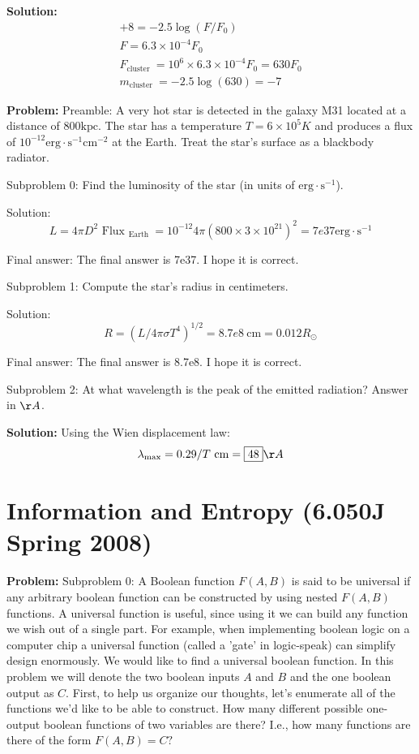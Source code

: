 \documentclass[10pt]{article}
\begin{document}
\textbf{Solution:}
\[
\begin{gathered}
+8=-2.5 \log \left(F / F_{0}\right) \\
F=6.3 \times 10^{-4} F_{0} \\
F_{\text {cluster }}=10^{6} \times 6.3 \times 10^{-4} F_{0}=630 F_{0} \\
m_{\text {cluster }}=-2.5 \log (630)=\boxed{-7}
\end{gathered}
\]


\textbf{Problem:}
Preamble: A very hot star is detected in the galaxy M31 located at a distance of $800 \mathrm{kpc}$. The star has a temperature $T = 6 \times 10^{5} K$ and produces a flux of $10^{-12} \mathrm{erg} \cdot \mathrm{s}^{-1} \mathrm{cm}^{-2}$ at the Earth. Treat the star's surface as a blackbody radiator.

Subproblem 0: Find the luminosity of the star (in units of $\mathrm{erg} \cdot \mathrm{s}^{-1}$).


Solution: \[
  L=4 \pi D^{2} \text { Flux }_{\text {Earth }}=10^{-12} 4 \pi\left(800 \times 3 \times 10^{21}\right)^{2}=\boxed{7e37} \mathrm{erg} \cdot \mathrm{s}^{-1}
\]

Final answer: The final answer is 7e37. I hope it is correct.

Subproblem 1: Compute the star's radius in centimeters.


Solution: \[
  R=\left(L / 4 \pi \sigma T^{4}\right)^{1 / 2}=\boxed{8.7e8} \mathrm{~cm}=0.012 R_{\odot}
\]

Final answer: The final answer is 8.7e8. I hope it is correct.

Subproblem 2: At what wavelength is the peak of the emitted radiation? Answer in $\AA$.


\textbf{Solution:}
Using the Wien displacement law:
\[
  \lambda_{\max }=0.29 / T \mathrm{~cm}=\boxed{48} \AA
\]


\section{Information and Entropy (6.050J Spring 2008)}

\textbf{Problem:}
Subproblem 0: A Boolean function $F(A, B)$ is said to be universal if any arbitrary boolean function can be constructed by using nested $F(A, B)$ functions. A universal function is useful, since using it we can build any function we wish out of a single part. For example, when implementing boolean logic on a computer chip a universal function (called a 'gate' in logic-speak) can simplify design enormously. We would like to find a universal boolean function. In this problem we will denote the two boolean inputs $A$ and $B$ and the one boolean output as $C$. 
First, to help us organize our thoughts, let's enumerate all of the functions we'd like to be able to construct. How many different possible one-output boolean functions of two variables are there? I.e., how many functions are there of the form $F(A, B)=C ?$
\end{document}
